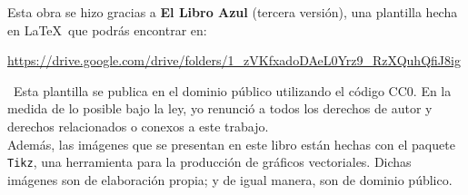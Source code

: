 Esta obra se hizo gracias a \textbf{\textsf{\color{jblueleft}El Libro Azul}} (tercera versión), una plantilla hecha en \LaTeX\ que podrás encontrar en:
\begin{center}
    \color{jblueleft}
    \underline{\url{https://drive.google.com/drive/folders/1_zVKfxadoDAeL0Yrz9_RzXQuhQfiJ8ig}}
\end{center}
\cczero\ Esta plantilla se publica en el dominio público utilizando el código CC0. En la medida de lo posible bajo la ley, yo renunció a todos los derechos de autor y derechos relacionados o conexos a este trabajo.\\


Además, las imágenes que se presentan en este libro están hechas con el paquete \texttt{Tikz}, una herramienta para la producción de gráficos vectoriales. Dichas imágenes son de elaboración propia; y de igual manera, son de dominio público.

\vfill

\begin{center}
\end{center}